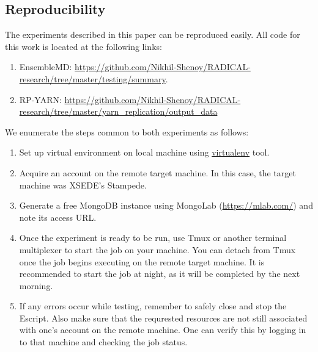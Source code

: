 \documentclass[]{article}
\begin{document}
	\subsection{Reproducibility}
		The experiments described in this paper can be reproduced easily. All code for this work is located at the following links:
		\begin{enumerate}
			\item EnsembleMD: \url{https://github.com/Nikhil-Shenoy/RADICAL-research/tree/master/testing/summary}. 
			\item RP-YARN: \url{https://github.com/Nikhil-Shenoy/RADICAL-research/tree/master/yarn_replication/output_data}
		\end{enumerate}

		We enumerate the steps common to both experiments as follows:
		\begin{enumerate}
			\item Set up virtual environment on local machine using \url{virtualenv} tool.
			\item Acquire an account on the remote target machine. In this case, the target machine was XSEDE's Stampede.
			\item Generate a free MongoDB instance using MongoLab (\url{https://mlab.com/}) and note its access URL.	
			\item Once the experiment is ready to be run, use Tmux or another terminal multiplexer to start the job on your machine. You can detach from Tmux once the job begins executing on the remote target machine. It is recommended to start the job at night, as it will be completed by the next morning.
			\item If any errors occur while testing, remember to safely close and stop the Escript. Also make sure that the requrested resources are not still associated with one's account on the remote machine. One can verify this by logging in to that machine and checking the job status.
		\end{enumerate}
\end{document}
